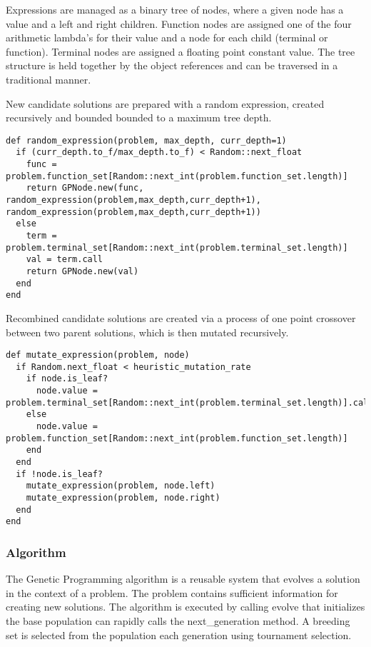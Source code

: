 Expressions are managed as a binary tree of nodes, where a given node has a value and a left and right children. Function nodes are assigned one of the four arithmetic lambda's for their value and a node for each child (terminal or function). Terminal nodes are assigned a floating point constant value. The tree structure is held together by the object references and can be traversed in a traditional manner.

New candidate solutions are prepared with a random expression, created recursively and bounded bounded to a maximum tree depth.

\begin{lstlisting}
def random_expression(problem, max_depth, curr_depth=1)
  if (curr_depth.to_f/max_depth.to_f) < Random::next_float
    func = problem.function_set[Random::next_int(problem.function_set.length)]
    return GPNode.new(func, random_expression(problem,max_depth,curr_depth+1), random_expression(problem,max_depth,curr_depth+1))
  else
    term = problem.terminal_set[Random::next_int(problem.terminal_set.length)]
    val = term.call
    return GPNode.new(val)
  end
end
\end{lstlisting}

Recombined candidate solutions are created via a process of one point crossover between two parent solutions, which is then mutated recursively.

\begin{lstlisting}
def mutate_expression(problem, node)
  if Random.next_float < heuristic_mutation_rate
    if node.is_leaf? 
      node.value = problem.terminal_set[Random::next_int(problem.terminal_set.length)].call
    else
      node.value = problem.function_set[Random::next_int(problem.function_set.length)]
    end
  end
  if !node.is_leaf?
    mutate_expression(problem, node.left)
    mutate_expression(problem, node.right)
  end
end
\end{lstlisting}

\subsubsection{Algorithm}
The Genetic Programming algorithm is a reusable system that evolves a solution in the context of a problem. The problem contains sufficient information for creating new solutions. The algorithm is executed by calling evolve that initializes the base population can rapidly calls the next\_generation method. A breeding set is selected from the population each generation using tournament selection.


